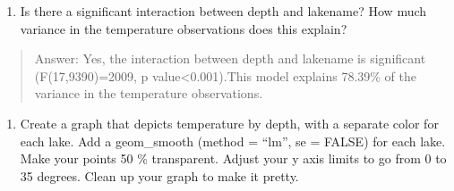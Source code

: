 \documentclass[]{article}
\newenvironment{Shaded}{\begin{snugshade}}{\end{snugshade}}
\newcommand{\CommentTok}[1]{\textcolor[rgb]{0.56,0.35,0.01}{\textit{#1}}}
\newcommand{\DataTypeTok}[1]{\textcolor[rgb]{0.13,0.29,0.53}{#1}}
\newcommand{\DecValTok}[1]{\textcolor[rgb]{0.00,0.00,0.81}{#1}}
\newcommand{\FloatTok}[1]{\textcolor[rgb]{0.00,0.00,0.81}{#1}}
\newcommand{\KeywordTok}[1]{\textcolor[rgb]{0.13,0.29,0.53}{\textbf{#1}}}
\newcommand{\NormalTok}[1]{#1}
\newcommand{\OperatorTok}[1]{\textcolor[rgb]{0.81,0.36,0.00}{\textbf{#1}}}
\newcommand{\OtherTok}[1]{\textcolor[rgb]{0.56,0.35,0.01}{#1}}
\newcommand{\StringTok}[1]{\textcolor[rgb]{0.31,0.60,0.02}{#1}}
\providecommand{\tightlist}{%
  \setlength{\itemsep}{0pt}\setlength{\parskip}{0pt}}
\begin{document}
\begin{enumerate}
\def\labelenumi{\arabic{enumi}.}
\setcounter{enumi}{6}
\tightlist
\item
  Is there a significant interaction between depth and lakename? How
  much variance in the temperature observations does this explain?
\end{enumerate}

\begin{quote}
Answer: Yes, the interaction between depth and lakename is significant
(F(17,9390)=2009, p value\textless0.001).This model explains 78.39\% of
the variance in the temperature observations.
\end{quote}

\begin{enumerate}
\def\labelenumi{\arabic{enumi}.}
\setcounter{enumi}{7}
\tightlist
\item
  Create a graph that depicts temperature by depth, with a separate
  color for each lake. Add a geom\_smooth (method = ``lm'', se = FALSE)
  for each lake. Make your points 50 \% transparent. Adjust your y axis
  limits to go from 0 to 35 degrees. Clean up your graph to make it
  pretty.
\end{enumerate}

\begin{Shaded}
\end{Shaded}
\end{document}

